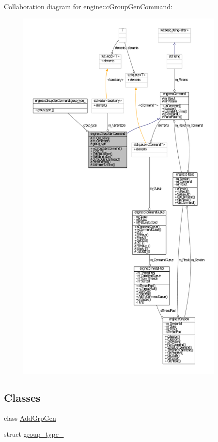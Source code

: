 \-Collaboration diagram for engine\-:\-:c\-Group\-Gen\-Command\-:\nopagebreak
\begin{figure}[H]
\begin{center}
\leavevmode
\includegraphics[height=550pt]{classengine_1_1cGroupGenCommand__coll__graph}
\end{center}
\end{figure}
\subsection*{\-Classes}
\begin{DoxyCompactItemize}
\item 
class \hyperlink{classengine_1_1cGroupGenCommand_1_1AddGrpGen}{\-Add\-Grp\-Gen}
\item 
struct \hyperlink{structengine_1_1cGroupGenCommand_1_1group__type__}{group\-\_\-type\-\_\-}
\end{DoxyCompactItemize}
